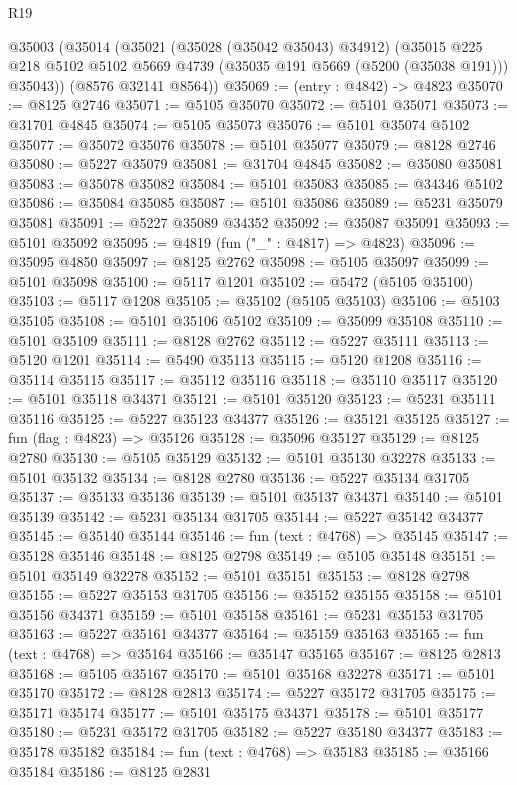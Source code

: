 \begin{lexlean}{R19}
\begin{coremodule}
{{{{{{{{{{{  @35003
    (@35014
      (@35021
        (@35028 (@35042 @35043) @34912)
        (@35015 @225 @218 @5102 @5102 @5669 @4739 (@35035 @191 @5669 (@5200 (@35038 @191))) @35043))
      (@8576 @32141 @8564))
@35069 := (entry : @4842) -> @4823
@35070 := @8125 @2746
@35071 := @5105 @35070
@35072 := @5101 @35071
@35073 := @31701 @4845
@35074 := @5105 @35073
@35076 := @5101 @35074 @5102
@35077 := @35072 @35076
@35078 := @5101 @35077
@35079 := @8128 @2746
@35080 := @5227 @35079
@35081 := @31704 @4845
@35082 := @35080 @35081
@35083 := @35078 @35082
@35084 := @5101 @35083
@35085 := @34346 @5102
@35086 := @35084 @35085
@35087 := @5101 @35086
@35089 := @5231 @35079 @35081
@35091 := @5227 @35089 @34352
@35092 := @35087 @35091
@35093 := @5101 @35092
@35095 := @4819 (fun ("_" : @4817) => @4823)
@35096 := @35095 @4850
@35097 := @8125 @2762
@35098 := @5105 @35097
@35099 := @5101 @35098
@35100 := @5117 @1201
@35102 := @5472 (@5105 @35100)
@35103 := @5117 @1208
@35105 := @35102 (@5105 @35103)
@35106 := @5103 @35105
@35108 := @5101 @35106 @5102
@35109 := @35099 @35108
@35110 := @5101 @35109
@35111 := @8128 @2762
@35112 := @5227 @35111
@35113 := @5120 @1201
@35114 := @5490 @35113
@35115 := @5120 @1208
@35116 := @35114 @35115
@35117 := @35112 @35116
@35118 := @35110 @35117
@35120 := @5101 @35118 @34371
@35121 := @5101 @35120
@35123 := @5231 @35111 @35116
@35125 := @5227 @35123 @34377
@35126 := @35121 @35125
@35127 := fun (flag : @4823) => @35126
@35128 := @35096 @35127
@35129 := @8125 @2780
@35130 := @5105 @35129
@35132 := @5101 @35130 @32278
@35133 := @5101 @35132
@35134 := @8128 @2780
@35136 := @5227 @35134 @31705
@35137 := @35133 @35136
@35139 := @5101 @35137 @34371
@35140 := @5101 @35139
@35142 := @5231 @35134 @31705
@35144 := @5227 @35142 @34377
@35145 := @35140 @35144
@35146 := fun (text : @4768) => @35145
@35147 := @35128 @35146
@35148 := @8125 @2798
@35149 := @5105 @35148
@35151 := @5101 @35149 @32278
@35152 := @5101 @35151
@35153 := @8128 @2798
@35155 := @5227 @35153 @31705
@35156 := @35152 @35155
@35158 := @5101 @35156 @34371
@35159 := @5101 @35158
@35161 := @5231 @35153 @31705
@35163 := @5227 @35161 @34377
@35164 := @35159 @35163
@35165 := fun (text : @4768) => @35164
@35166 := @35147 @35165
@35167 := @8125 @2813
@35168 := @5105 @35167
@35170 := @5101 @35168 @32278
@35171 := @5101 @35170
@35172 := @8128 @2813
@35174 := @5227 @35172 @31705
@35175 := @35171 @35174
@35177 := @5101 @35175 @34371
@35178 := @5101 @35177
@35180 := @5231 @35172 @31705
@35182 := @5227 @35180 @34377
@35183 := @35178 @35182
@35184 := fun (text : @4768) => @35183
@35185 := @35166 @35184
@35186 := @8125 @2831
}}}}}}}}}}}
\end{coremodule}
\end{lexlean}
